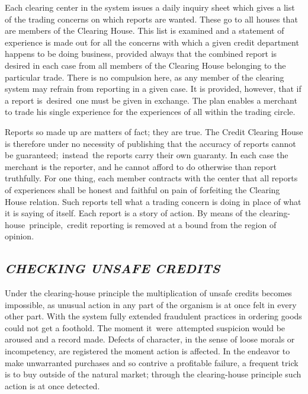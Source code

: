 \documentclass[twoside,symmetric,nobib,justified]{tufte-book}
\begin{document}
Each clearing center in the system issues a daily inquiry sheet which
gives a list of the trading concerns on which reports are wanted. These
go to all houses that are members of the Clearing House. This list is
examined and a statement of experience is made out for all the concerns
with which a given credit department happens to be doing business,
provided always that the combined report is desired in each case from
all members of the Clearing House belonging to the particular trade.
There is no compulsion here, as any member of the clearing system may
refrain from reporting in a given case. It is provided, however, that if
a report is~desired~one must be given in exchange. The plan enables a
merchant to trade his single experience for the experiences of all
within the trading circle.~

Reports so made up are matters of fact; they are true. The Credit
Clearing House is therefore under no necessity of publishing that the
accuracy of reports cannot be guaranteed;~instead~the reports carry
their own guaranty. In each case the merchant is the reporter, and he
cannot afford to do otherwise than report truthfully. For one thing,
each member contracts with the center that all reports of experiences
shall be honest and faithful on pain of forfeiting the Clearing House
relation. Such reports tell what a trading concern is doing in place of
what it is saying of itself. Each report is a story of action. By means
of the clearing-house~principle,~credit reporting is removed at a bound
from the region of opinion.~

\hypertarget{checking-unsafe-credits}{%
\subsection{\texorpdfstring{\emph{CHECKING UNSAFE
CREDITS}}{CHECKING UNSAFE CREDITS}}\label{checking-unsafe-credits}}

Under the clearing-house principle the multiplication of unsafe credits
becomes impossible, as unusual action in any part of the organism is at
once felt in every other part. With the system fully extended fraudulent
practices in ordering goods could not get a foothold. The moment
it~were~attempted suspicion would be aroused and a record made. Defects
of character, in the sense of loose morals or incompetency, are
registered the moment action is affected. In the endeavor to make
unwarranted purchases and so contrive a profitable failure, a frequent
trick is to buy outside of the natural market; through the
clearing-house principle such action is at once detected.~
\end{document}
